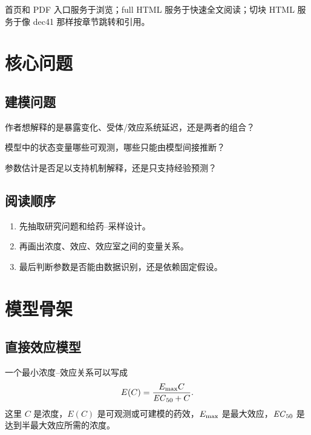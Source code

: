 \documentclass[a4paper]{article}
\begin{document}
\begin{remark}
  首页和 PDF 入口服务于浏览；full HTML 服务于快速全文阅读；切块 HTML 服务于像 dec41 那样按章节跳转和引用。
\end{remark}

\section{核心问题}

\subsection{建模问题}

\begin{question}
  作者想解释的是暴露变化、受体/效应系统延迟，还是两者的组合？
\end{question}

\begin{question}
  模型中的状态变量哪些可观测，哪些只能由模型间接推断？
\end{question}

\begin{question}
  参数估计是否足以支持机制解释，还是只支持经验预测？
\end{question}

\subsection{阅读顺序}

\begin{enumerate}[leftmargin=2em]
  \item 先抽取研究问题和给药--采样设计。
  \item 再画出浓度、效应、效应室之间的变量关系。
  \item 最后判断参数是否能由数据识别，还是依赖固定假设。
\end{enumerate}

\section{模型骨架}

\subsection{直接效应模型}

一个最小浓度--效应关系可以写成
\[
  E(C) = \frac{\Emax C}{\ECfifty + C}.
\]
这里 $C$ 是浓度，$E(C)$ 是可观测或可建模的药效，$E_{\max}$ 是最大效应，$\ECfifty$ 是达到半最大效应所需的浓度。
\end{document}
